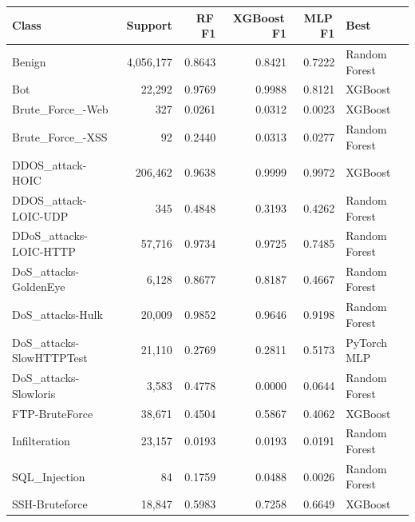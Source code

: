 \begin{tabular}{lrrrrl}
  \toprule
  Class & Support & RF\,F1 & XGBoost\,F1 & MLP\,F1 & Best \\
  \midrule
  Benign & 4,056,177 & 0.8643 & 0.8421 & 0.7222 & Random Forest \\
  Bot & 22,292 & 0.9769 & 0.9988 & 0.8121 & XGBoost \\
  Brute\_Force\_-Web & 327 & 0.0261 & 0.0312 & 0.0023 & XGBoost \\
  Brute\_Force\_-XSS & 92 & 0.2440 & 0.0313 & 0.0277 & Random Forest \\
  DDOS\_attack-HOIC & 206,462 & 0.9638 & 0.9999 & 0.9972 & XGBoost \\
  DDOS\_attack-LOIC-UDP & 345 & 0.4848 & 0.3193 & 0.4262 & Random Forest \\
  DDoS\_attacks-LOIC-HTTP & 57,716 & 0.9734 & 0.9725 & 0.7485 & Random Forest \\
  DoS\_attacks-GoldenEye & 6,128 & 0.8677 & 0.8187 & 0.4667 & Random Forest \\
  DoS\_attacks-Hulk & 20,009 & 0.9852 & 0.9646 & 0.9198 & Random Forest \\
  DoS\_attacks-SlowHTTPTest & 21,110 & 0.2769 & 0.2811 & 0.5173 & PyTorch MLP \\
  DoS\_attacks-Slowloris & 3,583 & 0.4778 & 0.0000 & 0.0644 & Random Forest \\
  FTP-BruteForce & 38,671 & 0.4504 & 0.5867 & 0.4062 & XGBoost \\
  Infilteration & 23,157 & 0.0193 & 0.0193 & 0.0191 & Random Forest \\
  SQL\_Injection & 84 & 0.1759 & 0.0488 & 0.0026 & Random Forest \\
  SSH-Bruteforce & 18,847 & 0.5983 & 0.7258 & 0.6649 & XGBoost \\
  \bottomrule
\end{tabular}

